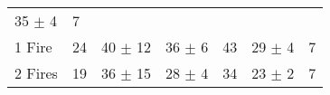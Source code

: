\documentclass[8pt,]{article}
\begin{document}
\begin{longtable}[]{@{}lllllll@{}}
\begin{minipage}[t]{0.18\columnwidth}
35 \(\pm\) 4\strut
\end{minipage} & \begin{minipage}[t]{0.04\columnwidth}\raggedright\strut
7\strut
\end{minipage}\tabularnewline
\begin{minipage}[t]{0.11\columnwidth}\raggedright\strut
1 Fire\strut
\end{minipage} & \begin{minipage}[t]{0.11\columnwidth}\raggedright\strut
24\strut
\end{minipage} & \begin{minipage}[t]{0.12\columnwidth}\raggedright\strut
40 \(\pm\) 12\strut
\end{minipage} & \begin{minipage}[t]{0.10\columnwidth}\raggedright\strut
36 \(\pm\) 6\strut
\end{minipage} & \begin{minipage}[t]{0.10\columnwidth}\raggedright\strut
43\strut
\end{minipage} & \begin{minipage}[t]{0.18\columnwidth}\raggedright\strut
29 \(\pm\) 4\strut
\end{minipage} & \begin{minipage}[t]{0.04\columnwidth}\raggedright\strut
7\strut
\end{minipage}\tabularnewline
\begin{minipage}[t]{0.11\columnwidth}\raggedright\strut
2 Fires\strut
\end{minipage} & \begin{minipage}[t]{0.11\columnwidth}\raggedright\strut
19\strut
\end{minipage} & \begin{minipage}[t]{0.12\columnwidth}\raggedright\strut
36 \(\pm\) 15\strut
\end{minipage} & \begin{minipage}[t]{0.10\columnwidth}\raggedright\strut
28 \(\pm\) 4\strut
\end{minipage} & \begin{minipage}[t]{0.10\columnwidth}\raggedright\strut
34\strut
\end{minipage} & \begin{minipage}[t]{0.18\columnwidth}\raggedright\strut
23 \(\pm\) 2\strut
\end{minipage} & \begin{minipage}[t]{0.04\columnwidth}\raggedright\strut
7\strut
\end{minipage}\tabularnewline

\end{longtable}
\end{document}
